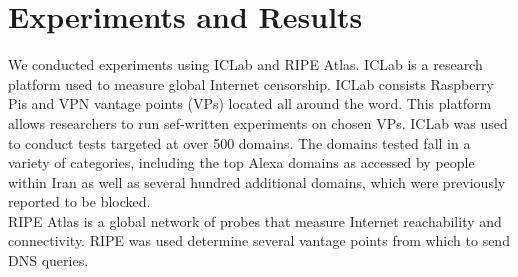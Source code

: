 \section{Experiments and Results}\label{sec:experimentsandresults}
We conducted experiments using ICLab and RIPE Atlas. ICLab is a research platform used to measure global Internet censorship. ICLab consists Raspberry Pis and VPN vantage points (VPs) located all around the word. This  platform allows researchers to run sef-written experiments on chosen VPs. ICLab was used to conduct tests targeted at over 500 domains. The domains tested fall in a variety of categories, including the top  Alexa domains as accessed by people within Iran as well as several hundred additional domains, which were previously reported to be blocked.\\
 RIPE Atlas is a global network of probes that measure Internet reachability and connectivity.  RIPE was used determine several vantage points from which to send DNS queries. 


